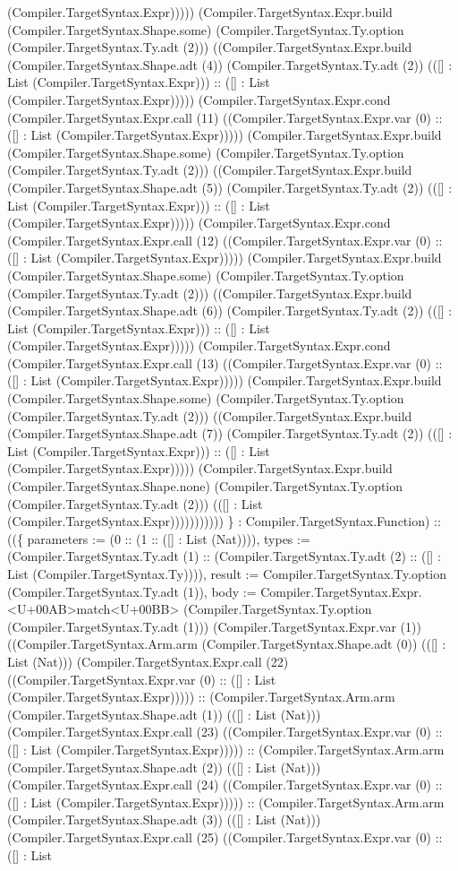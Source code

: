 \documentclass[11pt]{article}
\begin{document}
(Compiler.TargetSyntax.Expr))))) (Compiler.TargetSyntax.Expr.build (Compiler.TargetSyntax.Shape.some) (Compiler.TargetSyntax.Ty.option (Compiler.TargetSyntax.Ty.adt (2))) ((Compiler.TargetSyntax.Expr.build (Compiler.TargetSyntax.Shape.adt (4)) (Compiler.TargetSyntax.Ty.adt (2)) (([] : List (Compiler.TargetSyntax.Expr))) :: ([] : List (Compiler.TargetSyntax.Expr))))) (Compiler.TargetSyntax.Expr.cond (Compiler.TargetSyntax.Expr.call (11) ((Compiler.TargetSyntax.Expr.var (0) :: ([] : List (Compiler.TargetSyntax.Expr))))) (Compiler.TargetSyntax.Expr.build (Compiler.TargetSyntax.Shape.some) (Compiler.TargetSyntax.Ty.option (Compiler.TargetSyntax.Ty.adt (2))) ((Compiler.TargetSyntax.Expr.build (Compiler.TargetSyntax.Shape.adt (5)) (Compiler.TargetSyntax.Ty.adt (2)) (([] : List (Compiler.TargetSyntax.Expr))) :: ([] : List (Compiler.TargetSyntax.Expr))))) (Compiler.TargetSyntax.Expr.cond (Compiler.TargetSyntax.Expr.call (12) ((Compiler.TargetSyntax.Expr.var (0) :: ([] : List (Compiler.TargetSyntax.Expr))))) (Compiler.TargetSyntax.Expr.build (Compiler.TargetSyntax.Shape.some) (Compiler.TargetSyntax.Ty.option (Compiler.TargetSyntax.Ty.adt (2))) ((Compiler.TargetSyntax.Expr.build (Compiler.TargetSyntax.Shape.adt (6)) (Compiler.TargetSyntax.Ty.adt (2)) (([] : List (Compiler.TargetSyntax.Expr))) :: ([] : List (Compiler.TargetSyntax.Expr))))) (Compiler.TargetSyntax.Expr.cond (Compiler.TargetSyntax.Expr.call (13) ((Compiler.TargetSyntax.Expr.var (0) :: ([] : List (Compiler.TargetSyntax.Expr))))) (Compiler.TargetSyntax.Expr.build (Compiler.TargetSyntax.Shape.some) (Compiler.TargetSyntax.Ty.option (Compiler.TargetSyntax.Ty.adt (2))) ((Compiler.TargetSyntax.Expr.build (Compiler.TargetSyntax.Shape.adt (7)) (Compiler.TargetSyntax.Ty.adt (2)) (([] : List (Compiler.TargetSyntax.Expr))) :: ([] : List (Compiler.TargetSyntax.Expr))))) (Compiler.TargetSyntax.Expr.build (Compiler.TargetSyntax.Shape.none) (Compiler.TargetSyntax.Ty.option (Compiler.TargetSyntax.Ty.adt (2))) (([] : List (Compiler.TargetSyntax.Expr))))))))))) \} : Compiler.TargetSyntax.Function) :: ((\{ parameters := (0 :: (1 :: ([] : List (Nat)))), types := (Compiler.TargetSyntax.Ty.adt (1) :: (Compiler.TargetSyntax.Ty.adt (2) :: ([] : List (Compiler.TargetSyntax.Ty)))), result := Compiler.TargetSyntax.Ty.option (Compiler.TargetSyntax.Ty.adt (1)), body := Compiler.TargetSyntax.Expr.<U+00AB>match<U+00BB> (Compiler.TargetSyntax.Ty.option (Compiler.TargetSyntax.Ty.adt (1))) (Compiler.TargetSyntax.Expr.var (1)) ((Compiler.TargetSyntax.Arm.arm (Compiler.TargetSyntax.Shape.adt (0)) (([] : List (Nat))) (Compiler.TargetSyntax.Expr.call (22) ((Compiler.TargetSyntax.Expr.var (0) :: ([] : List (Compiler.TargetSyntax.Expr))))) :: (Compiler.TargetSyntax.Arm.arm (Compiler.TargetSyntax.Shape.adt (1)) (([] : List (Nat))) (Compiler.TargetSyntax.Expr.call (23) ((Compiler.TargetSyntax.Expr.var (0) :: ([] : List (Compiler.TargetSyntax.Expr))))) :: (Compiler.TargetSyntax.Arm.arm (Compiler.TargetSyntax.Shape.adt (2)) (([] : List (Nat))) (Compiler.TargetSyntax.Expr.call (24) ((Compiler.TargetSyntax.Expr.var (0) :: ([] : List (Compiler.TargetSyntax.Expr))))) :: (Compiler.TargetSyntax.Arm.arm (Compiler.TargetSyntax.Shape.adt (3)) (([] : List (Nat))) (Compiler.TargetSyntax.Expr.call (25) ((Compiler.TargetSyntax.Expr.var (0) :: ([] : List 
\end{document}
